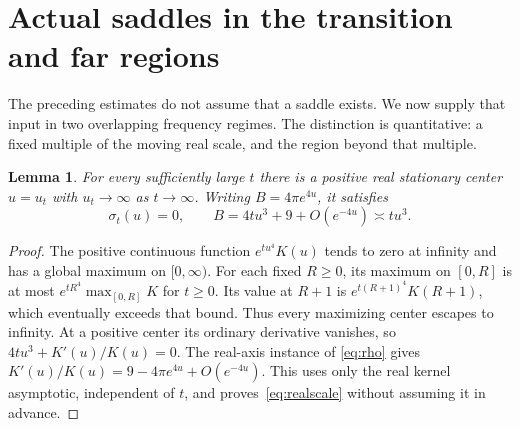 \documentclass[11pt]{article}
\newtheorem{lemma}[theorem]{Lemma}
\theoremstyle{remark}\newtheorem{remark}[theorem]{Remark}
\begin{document}
\section{Actual saddles in the transition and far regions}
The preceding estimates do not assume that a saddle exists.
We now supply that input in two overlapping frequency regimes.
The distinction is quantitative: a fixed multiple of the
moving real scale, and the region beyond that multiple.

\begin{lemma}\label{lem:realcenter}
For every sufficiently large $t$ there is a positive real
stationary center $u=u_t$ with $u_t\to\infty$ as $t\to\infty$.
Writing $B=4\pi e^{4u}$, it satisfies
\begin{equation}\label{eq:realscale}
 \sigma_t(u)=0,\qquad B=4tu^3+9+O(e^{-4u})\asymp tu^3.
\end{equation}
\end{lemma}
\begin{proof}
The positive continuous function $e^{tu^4}K(u)$ tends to zero
at infinity and has a global maximum on $[0,\infty)$.
For each fixed $R\geq0$, its maximum on $[0,R]$ is at most
$e^{tR^4}\max_{[0,R]}K$ for $t\geq0$. Its value at $R+1$
is $e^{t(R+1)^4}K(R+1)$, which eventually exceeds that bound.
Thus every maximizing center escapes to infinity.
At a positive center its ordinary derivative vanishes, so
$4tu^3+K'(u)/K(u)=0$. The real-axis instance of
\eqref{eq:rho} gives
$K'(u)/K(u)=9-4\pi e^{4u}+O(e^{-4u})$.
This uses only the real kernel asymptotic, independent of $t$,
and proves~\eqref{eq:realscale} without assuming it in advance.
\end{proof}
\end{document}
